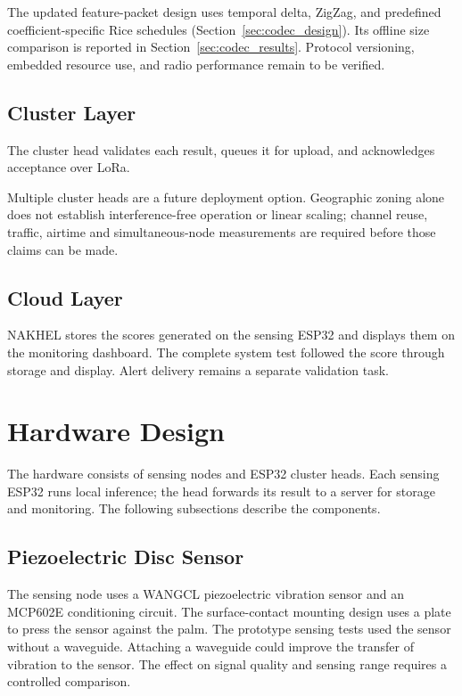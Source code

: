\documentclass[12pt,a4paper,oneside]{memoir}
\newcommand{\newrevision}[1]{#1}
\begin{document}
\newrevision{The updated feature-packet design uses temporal delta, ZigZag, and predefined coefficient-specific Rice schedules (Section~\ref{sec:codec_design}). Its offline size comparison is reported in Section~\ref{sec:codec_results}. Protocol versioning, embedded resource use, and radio performance remain to be verified.}

\subsection{Cluster Layer}

\newrevision{The cluster head validates each result, queues it for upload, and acknowledges acceptance over LoRa.}

\newrevision{Multiple cluster heads are a future deployment option. Geographic zoning alone does not establish interference-free operation or linear scaling; channel reuse, traffic, airtime and simultaneous-node measurements are required before those claims can be made.}


\subsection{Cloud Layer}

\newrevision{NAKHEL stores the scores generated on the sensing ESP32 and displays them on the monitoring dashboard. The complete system test followed the score through storage and display. Alert delivery remains a separate validation task.}

\section{Hardware Design}

\newrevision{The hardware consists of sensing nodes and ESP32 cluster heads. Each sensing ESP32 runs local inference; the head forwards its result to a server for storage and monitoring. The following subsections describe the components.}

\subsection{Piezoelectric Disc Sensor}

\newrevision{The sensing node uses a WANGCL piezoelectric vibration sensor and an MCP602E conditioning circuit. The surface-contact mounting design uses a plate to press the sensor against the palm. The prototype sensing tests used the sensor without a waveguide. Attaching a waveguide could improve the transfer of vibration to the sensor. The effect on signal quality and sensing range requires a controlled comparison.}
\end{document}
